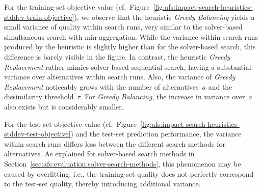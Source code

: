 \documentclass{article}
\theoremstyle{definition}
\begin{document}
For the training-set objective value (cf.~Figure~\ref{fig:afs:impact-search-heuristics-stddev-train-objective}), we observe that the heuristic \emph{Greedy Balancing} yields a small variance of quality within search runs, very similar to the solver-based simultaneous search with min-aggregation.
While the variance within search runs produced by the heuristic is slightly higher than for the solver-based search, this difference is barely visible in the figure.
In contrast, the heuristic \emph{Greedy Replacement} rather mimics solver-based sequential search, having a substantial variance over alternatives within search runs.
Also, the variance of \emph{Greedy Replacement} noticeably grows with the number of alternatives~$a$ and the dissimilarity threshold~$\tau$.
For \emph{Greedy Balancing}, the increase in variance over~$a$ also exists but is considerably smaller.

For the test-set objective value (cf.~Figure~\ref{fig:afs:impact-search-heuristics-stddev-test-objective}) and the test-set prediction performance, the variance within search runs differs less between the different search methods for alternatives.
As explained for solver-based search methods in Section~\ref{sec:afs:evaluation:solver-search-methods}, this phenomenon may be caused by overfitting, i.e., the training-set quality does not perfectly correspond to the test-set quality, thereby introducing additional variance.
\end{document}
